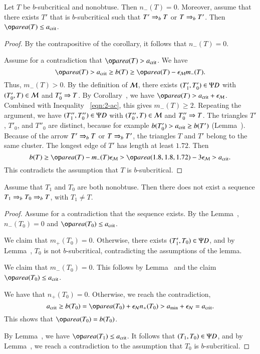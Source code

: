 \begin{lemma}  
  Let $T$ be $b$-subcritical and nonobtuse.  Then $n_-(T)=0$.
  Moreover, assume that there exists $T'$ that is $b$-subcritical such
  that $T'\Rightarrow_{b} T$ or $T\Rightarrow_{b} T'$.  Then $\area(T)\le \acrit$.
\end{lemma}

\begin{proof}  
  By the contrapositive of the corollary, it follows that $n_-(T)=0$.

  Assume for a contradiction that $\area(T) > \acrit$.  We have
\begin{equation}\libel{eqn:2-ac}
\area(T) > \acrit \ge b(T) \ge \area(T) - \epsM m_-(T).
\end{equation}
Thus, $m_-(T) >0$.  By the definition of $\mathcal M$, there exists
$(T'_1,T'_0)\in\Psi D$ with $(T'_0,T)\in\mathcal M$ and $T'_0\Rightarrow T$.  By
Corollary~, we have $\area(T) >
\acrit+\epsM$. Combined with Inequality ~\eqref{eqn:2-ac}, this gives
$m_-(T)\ge 2$.  Repeating the argument, we have $(T''_1,T''_0)\in \Psi D$
with $(T''_0,T)\in \mathcal M$ and $T''_0\Rightarrow T$.  The triangles $T'$, $T'_0$,
and $T''_0$ are distinct, because for example $b(T'_0) > a_\text{crit} \ge
b(T')$ (Lemma~).  Because of the arrow $T'\Rightarrow_{b} T$ or $T\Rightarrow_{b}
T'$, the triangles $T$ and $T'$ belong to the same cluster.  The
longest edge of $T'$ has length at least $1.72$.  Then
\[
b(T) \ge \area(T) - m_-(T)\epsM > \area(1.8,1.8,1.72) - 3\epsM > \acrit.
\]
This  contradicts the assumption that $T$ is $b$-subcritical.
\end{proof}

\begin{lemma}  Assume that $T_1$ and $T_0$
  are both nonobtuse.  Then there does not exist a sequence $T_1\Rightarrow_{b}
  T_0 \Rightarrow_{b} T$, with $T_1\ne T$.
\end{lemma}

\begin{proof}  
  Assume for a contradiction that the sequence exists.  By the
  Lemma~, $n_-(T_0)=0$ and $\area(T_0)\le \acrit$.

  We claim that $m_+(T_0)=0$.  Otherwise, there exists
  $(T'_1,T_0)\in\Psi D$, and by Lemma~, $T_0$ is not
  $b$-subcritical, contradicting the assumptions of the lemma.

  We claim that $m_-(T_0)=0$.  This follows by
  Lemma~ and the claim $\area(T_0)\le \acrit$.

We have that $n_+(T_0)=0$.  Otherwise, we reach the contradiction,
\[
\acrit \ge b(T_0) =\area(T_0) + \epsN n_+(T_0) > \ao + \epsN = \acrit.
\]
This shows that $\area(T_0) = b(T_0)$.

By Lemma~, we have $\area(T_1)\le \acrit$.
It follows that $(T_1,T_0)\in\Psi D$, and by Lemma~,
we reach a contradiction to the assumption that $T_0$ is $b$-subcritical. 
\end{proof}
  
